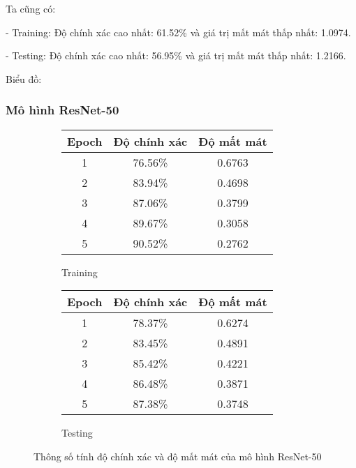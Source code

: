 \documentclass[../main.tex]{subfiles}
\begin{document}
Ta cũng có: 

- Training:
Độ chính xác cao nhất: 61.52\% và giá trị mất mát thấp nhất: 1.0974.

- Testing:
Độ chính xác cao nhất: 56.95\% và giá trị mất mát thấp nhất: 1.2166.

Biểu đồ:


\subsubsection*{Mô hình ResNet-50}


\begin{figure}[h!]
    \centering
    \begin{subfigure}[b]{0.45\textwidth}
        \centering
        \begin{tabular}{|c|c|c|}
            \hline
            \textbf{Epoch} & \textbf{Độ chính xác} & \textbf{Độ mất mát} \\
            \hline
            1 & 76.56\% & 0.6763 \\
            \hline
            2 & 83.94\% & 0.4698 \\
            \hline
            3 & 87.06\% & 0.3799 \\
            \hline
            4 & 89.67\% & 0.3058 \\
            \hline
            5 & 90.52\% & 0.2762 \\
            \hline
        \end{tabular}
        \caption{Training}
    \end{subfigure}
    \hfill
    \begin{subfigure}[b]{0.45\textwidth}
        \centering
        \begin{tabular}{|c|c|c|}
            \hline
            \textbf{Epoch} & \textbf{Độ chính xác} & \textbf{Độ mất mát} \\
            \hline
            1 & 78.37\% & 0.6274 \\
            \hline
            2 & 83.45\% & 0.4891 \\
            \hline
            3 & 85.42\% & 0.4221 \\
            \hline
            4 & 86.48\% & 0.3871 \\
            \hline
            5 & 87.38\% & 0.3748 \\
            \hline
        \end{tabular}
        \caption{Testing}
    \end{subfigure}
    \caption{Thông số tính độ chính xác và độ mất mát của mô hình ResNet-50}
\end{figure}
\end{document}
